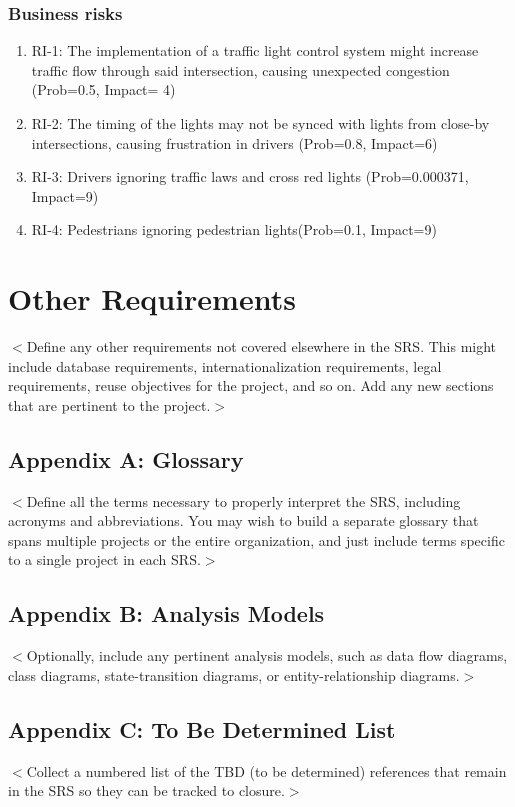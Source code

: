 \documentclass{scrreprt}
\begin{document}
\subsection{Business risks}
\begin{enumerate}
 \item RI-1: The implementation of a traffic light control system might increase
       traffic flow through said intersection, causing unexpected congestion
       (Prob=0.5, Impact= 4)
 \item RI-2: The timing of the lights may not be synced with lights from close-by
       intersections, causing frustration in drivers (Prob=0.8, Impact=6)
 \item RI-3: Drivers ignoring traffic laws and cross red lights (Prob=0.000371,
       Impact=9)
 \item RI-4: Pedestrians ignoring pedestrian lights(Prob=0.1, Impact=9)
       
\end{enumerate}

\chapter{Other Requirements}
$<$Define any other requirements not covered elsewhere in the SRS. This might
include database requirements, internationalization requirements, legal
requirements, reuse objectives for the project, and so on. Add any new sections
that are pertinent to the project.$>$

\section{Appendix A: Glossary}
$<$Define all the terms necessary to properly interpret the SRS, including
acronyms and abbreviations. You may wish to build a separate glossary that spans
multiple projects or the entire organization, and just include terms specific to
a single project in each SRS.$>$

\section{Appendix B: Analysis Models}
$<$Optionally, include any pertinent analysis models, such as data flow
diagrams, class diagrams, state-transition diagrams, or entity-relationship
diagrams.$>$

\section{Appendix C: To Be Determined List}
$<$Collect a numbered list of the TBD (to be determined) references that remain
in the SRS so they can be tracked to closure.$>$
\end{document}
